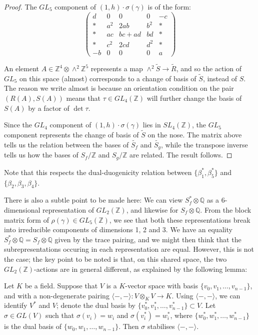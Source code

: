\documentclass{article}
\begin{document}
\begin{proof}
The $GL_5$ component of $(1,h) \cdot \sigma ( \gamma )$ is of the form:
\begin{equation}
\begin{pmatrix}
d & 0 & 0 & 0 & - c \\
* & a^2 & 2ab & b^2 & * \\
* & ac & bc+ad & bd & * \\
* & c^2 & 2cd & d^2 & * \\
- b & 0 & 0 & 0 & a
\end{pmatrix}
\end{equation}

An element $A \in \mathbb{Z}^4 \otimes \wedge^2 \mathbb{Z}^5$ represents a map $\wedge^2 \tilde{S} \to \tilde{R}$, and so the action of $GL_5$ on this space (almost) corresponds to a change of basis of $\tilde{S}$, instead of $S$.  The reason we write almost is because an orientation condition on the pair $(R(A),S(A))$ means that $\tau \in GL_4(\mathbb{Z})$ will further change the basis of $S(A)$ by a factor of $\det \tau$.

Since the $GL_4$ component of $(1,h) \cdot \sigma ( \gamma )$ lies in $SL_4(\mathbb{Z})$, the $GL_5$ component represents the change of basis of $\tilde{S}$ on the nose.  The matrix above tells us the relation between the bases of $\tilde{S_f}$ and $\tilde{S_g}$, while the transpose inverse tells us how the bases of $S_f / \mathbb{Z}$ and $S_g / \mathbb{Z}$ are related.  The result follows.
\end{proof}

Note that this respects the dual-duogenicity relation between $\{ \beta_1^*, \beta_5^* \}$ and $\{ \beta_2, \beta_3, \beta_4 \}$.

There is also a subtle point to be made here: We can view $S_f^* \otimes \mathbb{Q}$ as a 6-dimensional representation of $GL_2(\mathbb{Z})$, and likewise for $S_f \otimes \mathbb{Q}$.  From the block matrix form of $\rho (\gamma) \in GL_5(\mathbb{Z})$, we see that both these representations break into irreducible components of dimensions 1, 2 and 3.  We have an equality $S_f^* \otimes \mathbb{Q} = S_f \otimes \mathbb{Q}$ given by the trace pairing, and we might then think that the subrepresentations occuring in each representation are equal.  However, this is not the case; the key point to be noted is that, on this shared space, the two $GL_2(\mathbb{Z})$-actions are in general different, as explained by the following lemma:

\begin{lemma}
Let $K$ be a field.  Suppose that $V$ is a $K$-vector space with basis $\{v_0,v_1,\ldots,v_{n-1}\}$, and with a non-degenerate pairing $\langle -,- \rangle : V \otimes_K V \to K$.  Using $\langle -,- \rangle$, we can identify $V^*$ and $V$; denote the dual basis by $\{v_0^*,v_1^*,\ldots,v_{n-1}^*\} \subset V$.  Let $\sigma \in GL(V)$ such that $\sigma(v_i) = w_i$ and $\sigma(v_i^*) = w_i^*$, where $\{w_0^*,w_1^*,\ldots,w_{n-1}^*\}$ is the dual basis of $\{w_0,w_1,\ldots,w_{n-1}\}$.  Then $\sigma$ stabilises $\langle -,- \rangle$.
\end{lemma}
\end{document}
